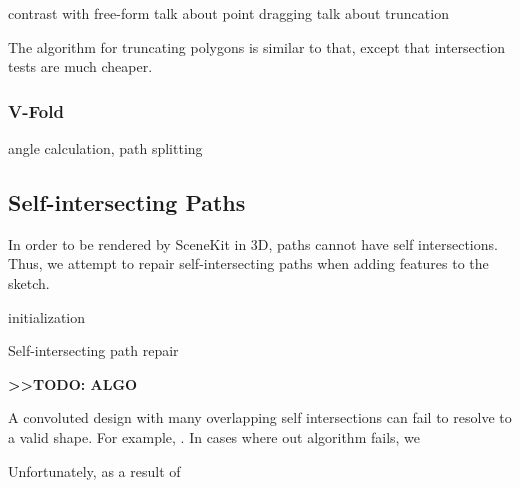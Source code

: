 contrast with free-form talk about point dragging talk about truncation

The algorithm for truncating polygons is similar to that, except that
intersection tests are much cheaper.

\subsubsection{V-Fold}\label{v-fold}

angle calculation, path splitting

\subsection{Self-intersecting Paths}\label{self-intersecting-paths}

In order to be rendered by SceneKit in 3D, paths cannot have self
intersections. Thus, we attempt to repair self-intersecting paths when
adding features to the sketch.

\begin{algorithm}[H]
 initialization\;
 \caption{Self-intersecting path repair}
\end{algorithm}

\textbf{\textgreater{}\textgreater{}TODO: ALGO}

A convoluted design with many overlapping self intersections can fail to
resolve to a valid shape. For example, . In cases where out algorithm
fails, we

Unfortunately, as a result of
